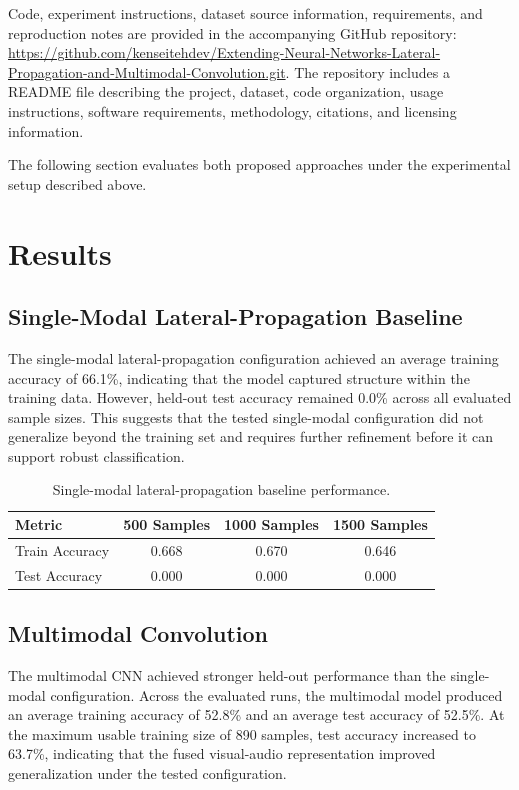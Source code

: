 \documentclass[lineno]{wlpeerj}
\begin{document}
Code, experiment instructions, dataset source information, requirements, and reproduction notes are provided in the accompanying GitHub repository: \url{https://github.com/kenseitehdev/Extending-Neural-Networks-Lateral-Propagation-and-Multimodal-Convolution.git}. The repository includes a README file describing the project, dataset, code organization, usage instructions, software requirements, methodology, citations, and licensing information.
	
	The following section evaluates both proposed approaches under the experimental setup described above.
	
\section{Results}

\subsection{Single-Modal Lateral-Propagation Baseline}

The single-modal lateral-propagation configuration achieved an average training accuracy of 66.1\%, indicating that the model captured structure within the training data. However, held-out test accuracy remained 0.0\% across all evaluated sample sizes. This suggests that the tested single-modal configuration did not generalize beyond the training set and requires further refinement before it can support robust classification.

	\begin{table}[h]
	\centering
	\begin{tabular}{lccc}
		\toprule
		Metric & 500 Samples & 1000 Samples & 1500 Samples \\
		\midrule
		Train Accuracy & 0.668 & 0.670 & 0.646 \\
		Test Accuracy & 0.000 & 0.000 & 0.000 \\
		\bottomrule
	\end{tabular}
\caption{Single-modal lateral-propagation baseline performance.}
\end{table}


\subsection{Multimodal Convolution}


The multimodal CNN achieved stronger held-out performance than the single-modal configuration. Across the evaluated runs, the multimodal model produced an average training accuracy of 52.8\% and an average test accuracy of 52.5\%. At the maximum usable training size of 890 samples, test accuracy increased to 63.7\%, indicating that the fused visual-audio representation improved generalization under the tested configuration.
\end{document}
